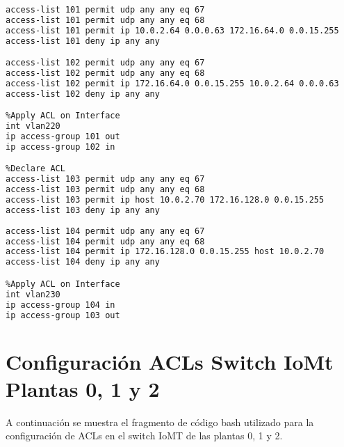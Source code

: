 \begin{lstlisting}[language=Bash, caption={Configuración ACLs Switch IoMt Planta 3}]
%Declare ACL
access-list 101 permit udp any any eq 67            
access-list 101 permit udp any any eq 68
access-list 101 permit ip 10.0.2.64 0.0.0.63 172.16.64.0 0.0.15.255
access-list 101 deny ip any any

access-list 102 permit udp any any eq 67            
access-list 102 permit udp any any eq 68
access-list 102 permit ip 172.16.64.0 0.0.15.255 10.0.2.64 0.0.0.63
access-list 102 deny ip any any

%Apply ACL on Interface
int vlan220
ip access-group 101 out
ip access-group 102 in

%Declare ACL
access-list 103 permit udp any any eq 67            
access-list 103 permit udp any any eq 68
access-list 103 permit ip host 10.0.2.70 172.16.128.0 0.0.15.255
access-list 103 deny ip any any
     
access-list 104 permit udp any any eq 67            
access-list 104 permit udp any any eq 68        
access-list 104 permit ip 172.16.128.0 0.0.15.255 host 10.0.2.70
access-list 104 deny ip any any

%Apply ACL on Interface
int vlan230
ip access-group 104 in
ip access-group 103 out
\end{lstlisting}

\section{Configuración ACLs Switch IoMt Plantas 0, 1 y 2}\label{anexo:aclIoMTP012}
A continuación se muestra el fragmento de código bash utilizado para la configuración de ACLs en el switch IoMT de las plantas 0, 1 y 2.


